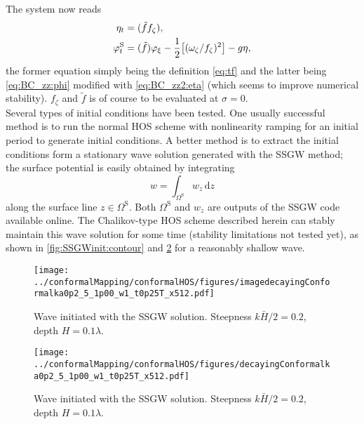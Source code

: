 \documentclass[a4paper,12pt]{article}
\newcommand{\mr}{\mathrm}
\renewcommand{\S}{^\mr{S}}
\renewcommand{\_}[1]{_\mr{#1}}
\let\Re\relax
\let\Im\relax
\DeclareMathOperator\Re{Re}
\DeclareMathOperator\Im{Im}
\newcommand{\w}{w}
\newcommand{\z}{z}
\newcommand{\zz}{\zeta}
\newcommand{\xx}{\xi}
\newcommand{\yy}{\sigma}
\newcommand{\zmap}{f}
\newcommand{\ww}{\omega}
\renewcommand{\w}{w}
\newcommand{\hzz}{\eta}
\newcommand{\tf}{\tilde \zmap}
\begin{document}
The system now reads
\begin{subequations}
\begin{align}
\eta_t&= \Im(\tf \zmap_\zz), \\
\varphi\S_t &= \Re(\tf)\varphi_\xx  - \frac12\Re \big[(\ww_\zz/\zmap_\zz)^2\big]  - g \hzz,
\end{align}%
\label{eq:BC_zz2}%
\end{subequations}%
the former equation simply being the definition \eqref{eq:tf} and the latter being \eqref{eq:BC_zz:phi} modified with \eqref{eq:BC_zz2:eta} (which seems to improve numerical stability).
$\zmap_\zz$ and $\tf$ is of course to be evaluated at $\yy=0$.
\\


Several types of initial conditions have been tested. 
One usually successful method is to run the normal HOS scheme with nonlinearity ramping for an initial period to generate initial conditions.
A better method is to extract the initial conditions form a stationary wave solution generated with the SSGW \citep{clamond2018accurate} method;
the surface potential is easily obtained by integrating
\[\w = \int_{\Omega\S}\! \w_\z \,\mr d z\] 
along the surface line $z\in\Omega\S$. 
Both $\Omega\S$ and  $\w_\z$ are outputs of the SSGW code available online. 
The Chalikov-type HOS scheme described herein can stably maintain this wave solution for some time (stability limitations not tested yet), as shown in \autoref{fig:SSGWinit:contour} and \ref{fig:SSGWinit:eta} for a reasonably shallow wave. 


\begin{figure}[h!ptb]%
\centering
\texttt{[image: ../conformalMapping/conformalHOS/figures/imagedecayingConformalka0p2\_M5\_h1p00\_Nw1\_dt0p25T\_nx512.pdf]}%
\caption{Wave initiated with the SSGW solution. Steepness $k\bar H/2=0.2$, depth $H=0.1\lambda$.}%
\label{fig:SSGWinit:contour}%
\end{figure}
\begin{figure}[h!ptb]%
\centering
\texttt{[image: ../conformalMapping/conformalHOS/figures/decayingConformalka0p2\_M5\_h1p00\_Nw1\_dt0p25T\_nx512.pdf]}%
\caption{Wave initiated with the SSGW solution. Steepness $k\bar H/2=0.2$, depth $H=0.1\lambda$.}%
\label{fig:SSGWinit:eta}%
\end{figure}
\end{document}
